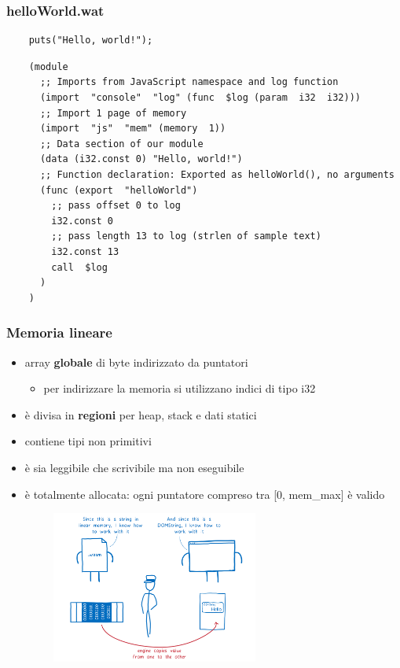\documentclass{beamer}
\newcommand\Fontvi{\fontsize{9.5}{7.2}\selectfont}
\begin{document}
\begin{frame}[fragile]
  \frametitle{helloWorld.wat}
  \Fontvi
  \begin{verbatim}
    puts("Hello, world!");
  \end{verbatim}
  
  \begin{verbatim}
    (module
      ;; Imports from JavaScript namespace and log function
      (import  "console"  "log" (func  $log (param  i32  i32)))
      ;; Import 1 page of memory
      (import  "js"  "mem" (memory  1))
      ;; Data section of our module
      (data (i32.const 0) "Hello, world!")
      ;; Function declaration: Exported as helloWorld(), no arguments
      (func (export  "helloWorld")
        ;; pass offset 0 to log
        i32.const 0
        ;; pass length 13 to log (strlen of sample text)
        i32.const 13          
        call  $log
      )
    ) 
  \end{verbatim}
\end{frame}

\begin{frame}
  \frametitle{Memoria lineare}
  \begin{itemize}
    \item array \textbf{globale} di byte indirizzato da puntatori
    \begin{itemize}
      \item per indirizzare la memoria si utilizzano indici di tipo i32
    \end{itemize}
  \item è divisa in \textbf{regioni} per heap, stack e dati statici
    \item contiene tipi non primitivi 
    \item è sia leggibile che scrivibile ma non eseguibile 
    \item è totalmente allocata: ogni puntatore compreso tra [0, mem\_max]
      è valido 
  \end{itemize}

  \centerline{\includegraphics[width=10cm,height=5cm,keepaspectratio]{images/memman.png}}
\end{frame}
\end{document}
